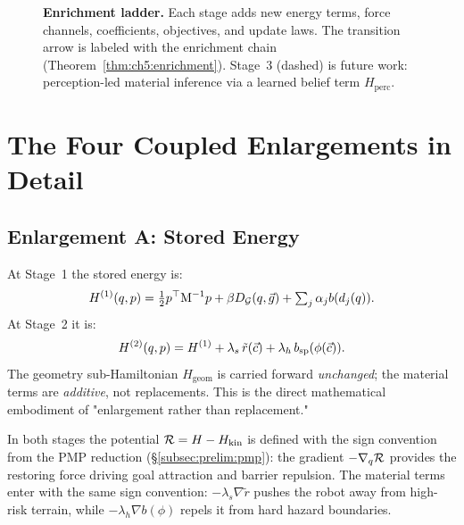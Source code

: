 \begin{figure}[htbp]
\caption{%
  \textbf{Enrichment ladder.}
  Each stage adds new energy terms, force channels, coefficients,
  objectives, and update laws.
  The transition arrow is labeled with the enrichment chain
  (Theorem~\ref{thm:ch5:enrichment}).
  Stage~3 (dashed) is future work: perception-led material inference
  via a learned belief term $H_{\mathrm{perc}}$.
}
\label{fig:ch5:enrichment_ladder}
\end{figure}

\section{The Four Coupled Enlargements in Detail}
\label{sec:ch5:four}

\subsection{Enlargement A: Stored Energy}
\label{subsec:ch5:energyA}

At Stage~1 the stored energy is:
\begin{equation}
  H^{(1)}(q,p)
  = \tfrac{1}{2}p^\top\mathrm{M}^{-1}p
    + \beta D_\mathcal{G}(q,\vec{g})
    + \textstyle\sum_j \alpha_j b(d_j(q)).
  \label{eq:ch5:H1}
\end{equation}
At Stage~2 it is:
\begin{equation}
  H^{(2)}(q,p)
  = H^{(1)} + \lambda_s\,\tilde{r}(\vec{c})
              + \lambda_h\,b_{\mathrm{sp}}(\phi(\vec{c})).
  \label{eq:ch5:H2}
\end{equation}
The geometry sub-Hamiltonian $H_{\mathrm{geom}}$ is carried forward
\emph{unchanged}; the material terms are \emph{additive}, not
replacements.
This is the direct mathematical embodiment of "enlargement rather than
replacement."

\begin{remark}
\label{rem:ch5:sign}
In both stages the potential $\mathcal{R} = H - H_{\mathrm{kin}}$
is defined with the sign convention from the PMP reduction
(§\ref{subsec:prelim:pmp}): the gradient
$-\nabla_q\mathcal{R}$ provides the restoring force driving
goal attraction and barrier repulsion.
The material terms enter with the same sign convention:
$-\lambda_s\nabla\tilde{r}$ pushes the robot away from high-risk
terrain, while $-\lambda_h\nabla b(\phi)$ repels it from hard hazard
boundaries.
\end{remark}

